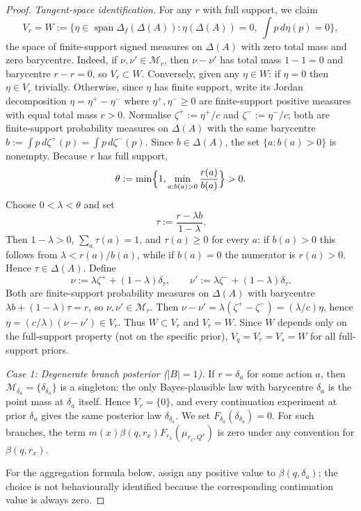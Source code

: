 \documentclass[11pt,a4paper]{article}
\theoremstyle{definition}
\newcommand{\1}{\mathbf 1}
\begin{document}
\begin{proof}
\emph{Tangent-space identification.}  For any $r$ with full support, we claim
\[
V_r=W:=\{\eta\in\operatorname{span}\Delta_f(\Delta(A)):\eta(\Delta(A))=0,\ \textstyle\int p\,d\eta(p)=0\},
\]
the space of finite-support signed measures on $\Delta(A)$ with zero total mass and zero barycentre.
Indeed, if $\nu,\nu'\in\mathcal M_r$, then $\nu-\nu'$ has total mass $1-1=0$ and barycentre $r-r=0$, so $V_r\subset W$.
Conversely, given any $\eta\in W$: if $\eta=0$ then $\eta\in V_r$ trivially.  Otherwise, since $\eta$ has finite support,
	write its Jordan decomposition $\eta=\eta^+-\eta^-$ where $\eta^+,\eta^-\ge 0$ are finite-support positive measures
	with equal total mass $c>0$.  Normalise $\zeta^+:=\eta^+/c$ and $\zeta^-:=\eta^-/c$; both are finite-support probability
	measures on $\Delta(A)$ with the same barycentre
	$b:=\int p\,d\zeta^+(p)=\int p\,d\zeta^-(p)$.  Since $b\in\Delta(A)$, the set $\{a:b(a)>0\}$ is nonempty.  Because $r$
	has full support,
	\[
	\theta:=\min\Bigl\{1,\min_{a:b(a)>0}\frac{r(a)}{b(a)}\Bigr\}>0.
	\]
	Choose $0<\lambda<\theta$ and set
	\[
	\tau:=\frac{r-\lambda b}{1-\lambda}.
	\]
	Then $1-\lambda>0$, $\sum_a\tau(a)=1$, and $\tau(a)\ge0$ for every $a$: if $b(a)>0$ this follows from
	$\lambda<r(a)/b(a)$, while if $b(a)=0$ the numerator is $r(a)>0$.  Hence $\tau\in\Delta(A)$.  Define
	\[
	\nu:=\lambda\zeta^++(1-\lambda)\delta_\tau,
	\qquad
	\nu':=\lambda\zeta^-+(1-\lambda)\delta_\tau.
	\]
	Both are finite-support probability measures on $\Delta(A)$ with barycentre $\lambda b+(1-\lambda)\tau=r$, so
	$\nu,\nu'\in\mathcal M_r$.  Then $\nu-\nu'=\lambda(\zeta^+-\zeta^-)=(\lambda/c)\eta$, hence
	$\eta=(c/\lambda)(\nu-\nu')\in V_r$.  Thus $W\subset V_r$ and $V_r=W$.
Since $W$ depends only on the full-support property (not on the specific prior), $V_q=V_r=V_s=W$ for all full-support priors.

\emph{Case 1: Degenerate branch posterior ($|B|=1$).}  If $r=\delta_a$ for some action $a$, then
	$\mathcal M_{\delta_a}=\{\delta_{\delta_a}\}$ is a singleton: the only Bayes-plausible law with barycentre $\delta_a$
	is the point mass at $\delta_a$ itself.  Hence $V_r=\{0\}$, and every continuation experiment at prior $\delta_a$ gives
	the same posterior law $\delta_{\delta_a}$.  We set $F_{\delta_a}(\delta_{\delta_a})=0$.  For such branches, the term
	$m(x)\beta(q,r_x)F_{r_x}(\mu_{r_x,Q^x})$ is zero under any convention for $\beta(q,r_x)$.

For the aggregation formula below, assign any positive value to $\beta(q,\delta_a)$; the choice is not behaviourally
identified because the corresponding continuation value is always zero.



\end{proof}
\end{document}
